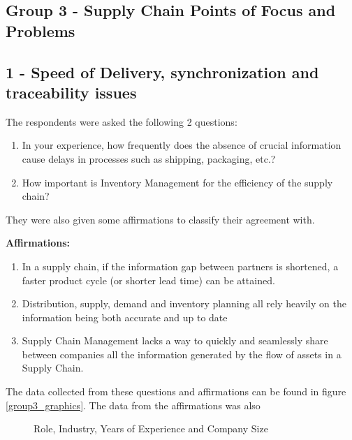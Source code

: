 \subsection{Group 3 - Supply Chain Points of Focus and Problems}

\subsection*{1 - Speed of Delivery, synchronization and traceability issues}

The respondents were asked the following 2 questions:
\begin{enumerate}
  \item In your experience, how frequently does the absence of crucial information cause delays in processes such as shipping, packaging, etc.?
  \item How important is Inventory Management for the efficiency of the supply chain?
\end{enumerate}
They were also given some affirmations to classify their agreement with. 
\par\textbf{Affirmations:}
\begin{enumerate}

\item In a supply chain, if the information gap between partners is shortened, a faster product cycle (or shorter lead time) can be attained.
\item Distribution, supply, demand and inventory planning all rely heavily on the information being both accurate and up to date

\item Supply Chain Management lacks a way to quickly and seamlessly share between companies all the information generated by the flow of assets in a Supply Chain.
\end{enumerate}

The data collected from these questions and affirmations can be found in figure \ref{group3_graphics}. The data from the affirmations was also

\begin{figure}[h]



      \caption{Role, Industry, Years of Experience and Company Size}
    \label{fig:group3_graphics}
\end{figure}







